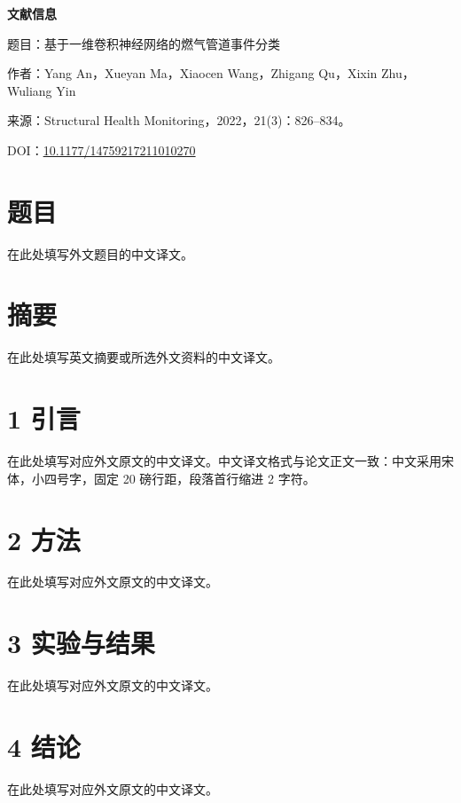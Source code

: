 \documentclass[12pt,openany,oneside,fontset=none]{ctexbook}
\begin{document}
\noindent\textbf{文献信息}

\noindent 题目：基于一维卷积神经网络的燃气管道事件分类

\noindent 作者：Yang An，Xueyan Ma，Xiaocen Wang，Zhigang Qu，Xixin Zhu，Wuliang Yin

\noindent 来源：Structural Health Monitoring，2022，21(3)：826--834。

\noindent DOI：\href{https://doi.org/10.1177/14759217211010270}{10.1177/14759217211010270}

\vspace{1em}

\section*{题目}

在此处填写外文题目的中文译文。

\section*{摘要}

在此处填写英文摘要或所选外文资料的中文译文。

\section*{1 引言}

在此处填写对应外文原文的中文译文。中文译文格式与论文正文一致：中文采用宋体，小四号字，固定 20 磅行距，段落首行缩进 2 字符。

\section*{2 方法}

在此处填写对应外文原文的中文译文。

\section*{3 实验与结果}

在此处填写对应外文原文的中文译文。

\section*{4 结论}

在此处填写对应外文原文的中文译文。
\end{document}
